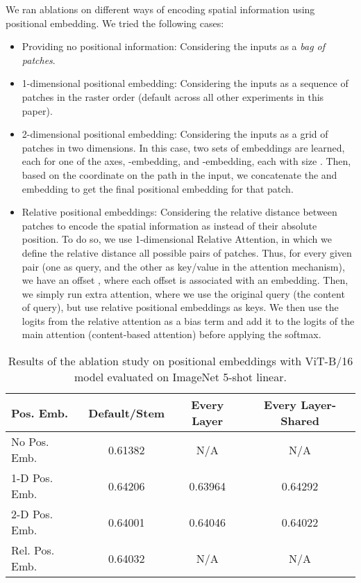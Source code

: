 \documentclass{article} \usepackage{iclr2021_conference,times}
\newcommand{\oursabbrv}{ViT\xspace}
\newcommand{\imagenet}{ImageNet\xspace}
\begin{document}
We ran ablations on different ways of encoding spatial information using positional embedding. We tried the following cases:
\begin{itemize}
    \item Providing no positional information: Considering the inputs as a \emph{bag of patches}.
    \item 1-dimensional positional embedding: Considering the inputs as a sequence of patches in the raster order (default across all other experiments in this paper).
    \item 2-dimensional positional embedding: Considering the inputs as a grid of patches in two dimensions. In this case, two sets of embeddings are learned, each for one of the axes, -embedding, and -embedding, each with size . Then, based on the coordinate on the path in the input, we concatenate the  and  embedding to get the final positional embedding for that patch.
    \item Relative positional embeddings:  Considering the relative distance between patches to encode the spatial information as instead of their absolute position. To do so, we use 1-dimensional Relative Attention, in which we define the relative distance all possible pairs of patches. Thus, for every given pair (one as query, and the other as key/value in the attention mechanism), we have an offset , where each offset is associated with an embedding. Then, we simply run extra attention, where we use the original query (the content of query), but use relative positional embeddings as keys. We then use the logits from the relative attention as a bias term and add it to the logits of the main attention (content-based attention) before applying the softmax. 
\end{itemize}



\begin{table}[t]
\centering
\begin{tabular}{l c c c}
\toprule
Pos. Emb. & Default/Stem & Every Layer & Every Layer-Shared \\
\midrule
No Pos. Emb. & 0.61382  & N/A & N/A \\
1-D Pos. Emb. & 0.64206 & 0.63964 & 0.64292 \\
2-D Pos. Emb. &  0.64001 & 0.64046  & 0.64022 \\
Rel. Pos. Emb. & 0.64032 & N/A & N/A \\
\bottomrule
\end{tabular}
\caption{Results of the ablation study on positional embeddings with \oursabbrv-B/16 model evaluated on \imagenet 5-shot linear.}
\label{tbl:pos_emb_abblation}
\end{table}
\end{document}
